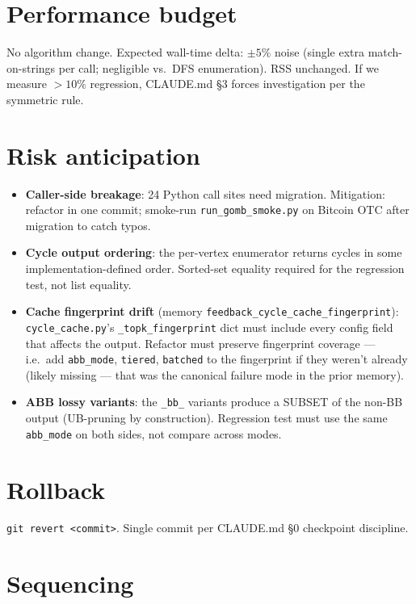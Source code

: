 \documentclass[11pt]{article}
\begin{document}
\section{Performance budget}

No algorithm change.  Expected wall-time delta: \(\pm 5\%\) noise (single
extra match-on-strings per call; negligible vs.\ DFS enumeration).  RSS
unchanged.  If we measure $> 10\%$ regression, CLAUDE.md \S 3 forces
investigation per the symmetric rule.

\section{Risk anticipation}

\begin{itemize}
  \item \textbf{Caller-side breakage}: 24 Python call sites need
    migration.  Mitigation: refactor in one commit; smoke-run
    \texttt{run\_gomb\_smoke.py} on Bitcoin OTC after migration to
    catch typos.
  \item \textbf{Cycle output ordering}: the per-vertex enumerator
    returns cycles in some implementation-defined order.  Sorted-set
    equality required for the regression test, not list equality.
  \item \textbf{Cache fingerprint drift} (memory
    \texttt{feedback\_cycle\_cache\_fingerprint}): \texttt{cycle\_cache.py}'s
    \texttt{\_topk\_fingerprint} dict must include every config field
    that affects the output.  Refactor must preserve fingerprint coverage
    — i.e.\ add \texttt{abb\_mode}, \texttt{tiered}, \texttt{batched} to the
    fingerprint if they weren't already (likely missing — that was
    the canonical failure mode in the prior memory).
  \item \textbf{ABB lossy variants}: the \texttt{\_bb\_} variants
    produce a SUBSET of the non-BB output (UB-pruning by construction).
    Regression test must use the same \texttt{abb\_mode} on both sides,
    not compare across modes.
\end{itemize}

\section{Rollback}

\texttt{git revert <commit>}.  Single commit per CLAUDE.md \S 0
checkpoint discipline.

\section{Sequencing}
\end{document}
